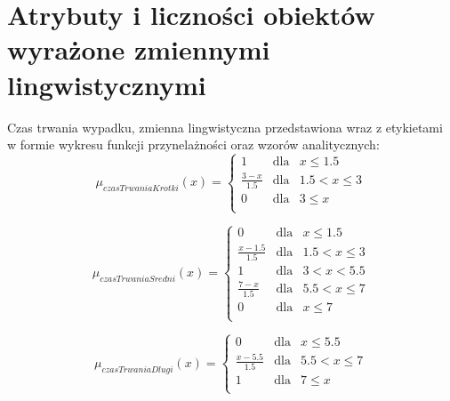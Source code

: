 \documentclass{classrep}
\begin{document}
\section{Atrybuty i liczności obiektów wyrażone zmiennymi lingwistycznymi}



Czas trwania wypadku, zmienna lingwistyczna przedstawiona wraz z etykietami w formie wykresu funkcji przynelażności oraz wzorów analitycznych:
\begin{equation}
\mu _{czasTrwaniaKrotki}(x) =  \left\{ \begin{array}{rcl}
 1 & \mbox{dla} & x  \leq 1.5 \\
\frac{3 - x}{1.5} & \mbox{dla} & 1.5 < x \leq 3\\
0 & \mbox{dla} & 3 \leq x\\
\end{array}\right.
\end{equation}

\begin{equation}
\mu _{czasTrwaniaSredni}(x) =  \left\{ \begin{array}{rcl}
 0 & \mbox{dla} & x  \leq 1.5 \\
\frac{x - 1.5}{1.5} & \mbox{dla} & 1.5 < x \leq 3\\
1 & \mbox{dla} & 3 < x < 5.5\\
\frac{7 - x}{1.5} & \mbox{dla} & 5.5 < x \leq 7\\
 0 & \mbox{dla} & x  \leq 7 \\
\end{array}\right.
\end{equation}

\begin{equation}
\mu _{czasTrwaniaDlugi}(x) =  \left\{ \begin{array}{rcl}
 0 & \mbox{dla} & x \leq 5.5 \\
\frac{x - 5.5}{1.5} & \mbox{dla} & 5.5 < x \leq 7\\
1 & \mbox{dla} & 7 \leq x\\
\end{array}\right.
\end{equation}
\end{document}
